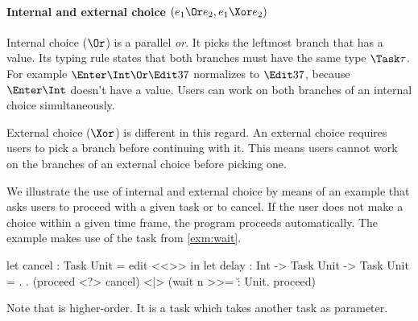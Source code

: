 \paragraph{Internal and external choice $(e_1 \Or e_2, e_1 \Xor e_2)$}

Internal choice ($\Or$) is a parallel \emph{or}.
It picks the leftmost branch that has a value.
Its typing rule  states that both branches must have the same type $\Task \tau$.
For example $\Enter \Int \Or \Edit 37$ normalizes to $\Edit 37$, because $\Enter \Int$ doesn't have a value.
Users can work on both branches of an internal choice simultaneously.

External choice ($\Xor$) is different in this regard.
An external choice requires users to pick a branch before continuing with it.
This means users cannot work on the branches of an external choice before picking one.


\begin{example}[Delay]
\label{exm:delay}


We illustrate the use of internal and external choice by means of
an example that asks users to proceed with a given task or to cancel.
If the user does not make a choice within a given time frame, the program proceeds automatically.
The example makes use of the task  from \cref{exm:wait}.
\begin{TASK}
  let cancel : Task Unit = edit <<>> in
  let delay : Int -> Task Unit -> Task Unit = \n. \proceed.
    (proceed <?> cancel) <|> (wait n >>= \u : Unit. proceed)
\end{TASK}
Note that  is higher-order.
It is a task which takes another task as parameter.

\end{example}

%
%
%

